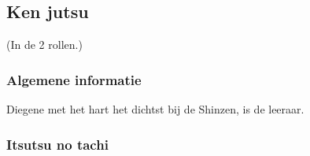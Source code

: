 
\newcommand{\suwaristart}{Suwari houding. Rechterknie naar voor, linkerknie links onder een hoek van 45 graden. Hand open op het rechterbeen leggen, net voor de knie en met de handpalm naar boven gericht.\\
Linkerhand houdt de saya vast, met de wijsvinger achter de tsuba vanonder (zodat hij er niet kan uitvallen) en de duim er boven op, maar net iets meer langs de binnenkant. Je moet opletten dat je, bij het trekken van het zwaard, niet in je duim snijdt. En je duim (in combinatie met je wijsvinger) kan een boost geven aan de tsuba, zodat het handvat losklikt uit de saya en eruit schiet. Daarmee win je iets extra aan tijd.\\
Rechterhand komt boven je handvat en schuift 1 handlengte richting tsuba.\\
Dan draait de rechterhand om. Dit zou de perfecte lengte moeten zijn, zodat je het zwaard ineens kunt vastpakken net onder de tsuba.\\}

\newcommand{\suwaristop}{Finale slag (en ondertussen ``toooo'' roepen). Dieper zakken.\\
Terug iets rechter kopen.\\
Zanshin.\\
Subari.\\
Not\-{o}.}

\newcommand{\pA}{De leraar}
\newcommand{\pB}{De leerling}
\newcommand{\pa}{de leraar}
\newcommand{\pb}{de leerling}

\subsection{Ken jutsu}
(In de 2 rollen.)

\subsubsection{Algemene informatie}

Diegene met het hart het dichtst bij de Shinzen, is de leeraar.\\

\subsubsection{Itsutsu no tachi}


